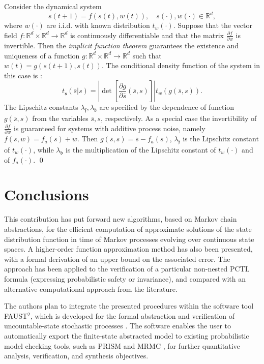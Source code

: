 \documentclass{LMCS}
\begin{document}
\begin{exa}
\label{ex:non_linear}
Consider the dynamical system 
\begin{equation*}
s(t+1) = f(s(t),w(t)),\quad s(\cdot),w(\cdot)\in\mathbb R^d,
\end{equation*}
where $w(\cdot)$ are i.i.d. with known distribution $t_w(\cdot)$. 
Suppose that the vector field $f:\mathbb R^d\times\mathbb R^d\rightarrow\mathbb R^d$ is continuously differentiable and that the matrix $\frac{\partial f}{\partial w}$ is invertible. 
Then the \emph{implicit function theorem} guarantees the existence and uniqueness of a function $g:\mathbb R^d\times\mathbb R^d\rightarrow\mathbb R^d$ such that $w(t) = g(s(t+1),s(t))$. 
The conditional density function of the system in this case is \cite{Papoulis91}:
\begin{equation*}
t_{\mathfrak s}(\bar s|s) = \left|\det\left[\frac{\partial g}{\partial \bar s}(\bar s,s)\right]\right|t_w(g(\bar s,s)).
\end{equation*}
The Lipschitz constants $\lambda_{\mathfrak f},\lambda_{\mathfrak b}$ are specified by the dependence of function $g(\bar s,s)$ from the variables $\bar s,s$, respectively.
As a special case the invertibility of $\frac{\partial f}{\partial w}$ is guaranteed for systems with additive process noise, namely
$f(s,w) = f_a(s)+w$. Then $g(\bar s,s) = \bar s-f_a(s)$,
$\lambda_{\mathfrak f}$ is the Lipschitz constant of $t_w(\cdot)$,
while $\lambda_{\mathfrak b}$ is the multiplication of the Lipschitz constant of $t_w(\cdot)$ and of $f_a(\cdot)$. \hfill\qed
\end{exa}

\section{Conclusions} 
\label{sec:concl}

This contribution has put forward new algorithms, 
based on Markov chain abstractions, 
for the efficient computation of approximate solutions of the state distribution function in time of Markov processes evolving over continuous state spaces. 
A higher-order function approximation method has also been presented, with a formal derivation of an upper bound on the associated error.  
The approach has been applied to the verification of a particular non-nested PCTL formula (expressing probabilistic safety or invariance), 
and compared with an alternative computational approach from the literature.

The authors plan to integrate the presented procedures within the software tool \textsf{FAUST}$^{\mathsf 2}$, 
which is developed for the formal abstraction and verification of uncountable-state stochastic processes \cite{FAUST15}. 
The software enables the user to automatically export the finite-state abstracted model to existing probabilistic model checking tools,  
such as PRISM and MRMC \cite{HKNP06,KKZ05}, for further quantitative analysis, verification, and synthesis objectives.
  
\end{document}

